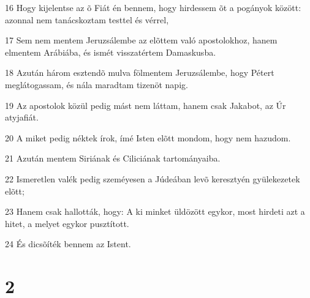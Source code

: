 \par 16 Hogy kijelentse az õ Fiát én bennem, hogy hirdessem õt a pogányok között: azonnal nem tanácskoztam testtel és vérrel,
\par 17 Sem nem mentem Jeruzsálembe az elõttem való apostolokhoz, hanem elmentem Arábiába, és ismét visszatértem Damaskusba.
\par 18 Azután három esztendõ mulva fölmentem Jeruzsálembe, hogy Pétert meglátogassam, és nála maradtam tizenöt napig.
\par 19 Az apostolok közül pedig mást nem láttam, hanem csak Jakabot, az Úr atyjafiát.
\par 20 A miket pedig néktek írok, ímé Isten elõtt mondom, hogy nem hazudom.
\par 21 Azután mentem Siriának és Ciliciának tartományaiba.
\par 22 Ismeretlen valék pedig szeméyesen a Júdeában levõ keresztyén gyülekezetek elõtt;
\par 23 Hanem csak hallották, hogy: A ki minket üldözött egykor, most hirdeti azt a hitet, a melyet egykor pusztított.
\par 24 És dicsõíték bennem az Istent.

\chapter{2}

